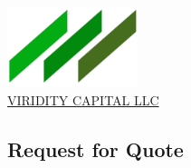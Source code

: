 \begin{center}
  \href{\website}{\includegraphics[width=1.5in]{logo.png}}\\
  \href{\website}{\Huge{VIRIDITY CAPITAL LLC}}
\end{center}

\begin{center}
\section*{Request for Quote}
\end{center}
\renewcommand{\arraystretch}{1.2}
